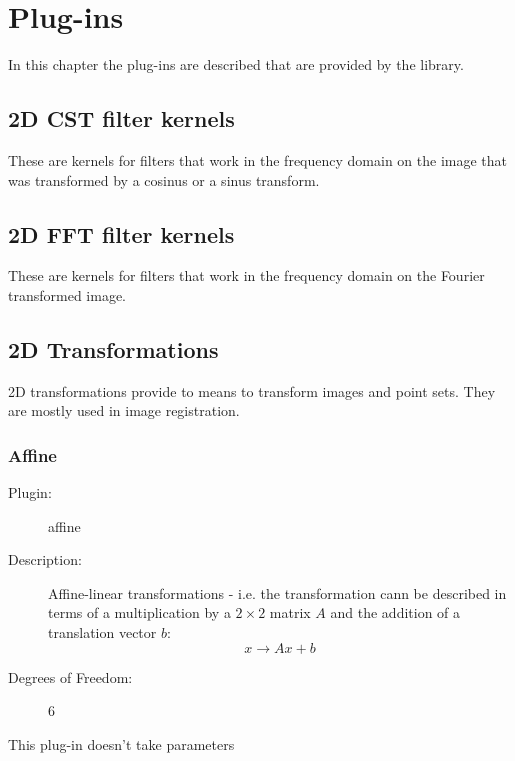\chapter{Plug-ins}
In this chapter the plug-ins are described that are provided by the library.
\label{ch:plugins}\section{2D CST filter kernels}   \label {sec:cst2dkern}
   
   These are kernels for filters that work in the frequency domain on the 
   image that was transformed by a cosinus or a sinus transform. 

\section{2D FFT filter kernels}   \label {sec:fft2dkern}
   
   These are kernels for filters that work in the frequency domain on the 
   Fourier transformed image. 

\section{2D Transformations}  \label{sec:2dtransforms}
  
  2D transformations provide to means to transform images and point sets. They are mostly used 
  in image registration. 
  
  
   \subsection{Affine}
   \label{transform2d:affine}
   
   \begin{description}
   
   \item [Plugin:] affine
   \item [Description:] Affine-linear transformations - i.e. the transformation cann be described in terms of a 
   multiplication by a $2\times2$ matrix $A$ and the addition of a translation vector $b$: 
   \begin{equation}
   x \rightarrow Ax + b
   \end{equation}
   
   \item [Degrees of Freedom:] 6 
  
   \end{description}
   This plug-in doesn't take parameters 

